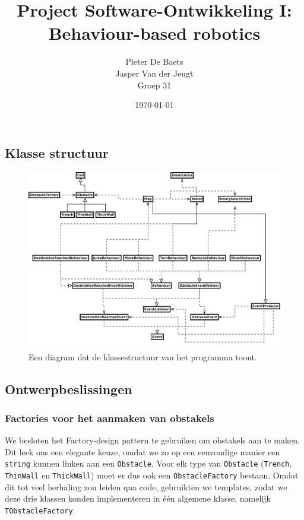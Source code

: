 \documentclass[a4paper]{article}
\title{Project Software-Ontwikkeling I: \\
       Behaviour-based robotics}
\author{Pieter De Baets \\
        Jasper Van der Jeugt \\
        Groep 31}
\date{\today}
\begin{document}
\maketitle
\subsection*{Klasse structuur}
\begin{figure}
\begin{center}
\includegraphics[width=\textwidth]{diagram.pdf}
\caption{Een diagram dat de klassestructuur van het programma toont.}
\label{fig:diagram}
\end{center}
\end{figure}

\subsection*{Ontwerpbeslissingen}
\subsubsection*{Factories voor het aanmaken van obstakels}
We besloten het Factory-design pattern te gebruiken om obstakels aan te maken.
Dit leek ons een elegante keuze, omdat we zo op een eenvoudige manier een
\verb#string# kunnen linken aan een \verb#Obstacle#. Voor elk type van
\verb#Obstacle# (\verb#Trench#, \verb#ThinWall# en \verb#ThickWall#) moet er
dus ook een \verb#ObstacleFactory# bestaan. Omdat dit tot veel herhaling zou
leiden qua code, gebruikten we templates, zodat we deze drie klassen konden
implementeren in \'e\'en algemene klasse, namelijk \verb#TObstacleFactory#.
\end{document}
